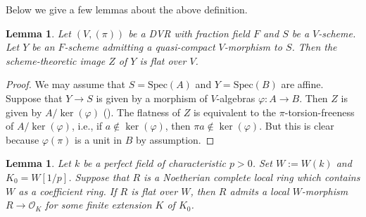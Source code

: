 \documentclass[letter, 11pt]{article}
\theoremstyle{plain}
\newtheorem{lemma}[subsubsection]{Lemma}
\theoremstyle{definition}
\newcommand{\Spec}{\mathrm{Spec}}
\newcommand{\<}{\langle}
\renewcommand{\>}{\rangle}
\newcommand{\sO}{\mathcal{O}}
\begin{document}
Below we give a few lemmas about the above definition. 

\begin{lemma}
\label{lem: Zariski closure is flat}
    Let $(V, (\pi))$ be a DVR with fraction field $F$ and $S$ be a $V$-scheme. Let $Y$ be an $F$-scheme admitting a quasi-compact $V$-morphism to $S$. Then the scheme-theoretic image $Z$ of $Y$ is flat over $V$. 
\end{lemma}

\begin{proof}
    We may assume that $S = \Spec(A)$ and $Y = \Spec(B)$ are affine. Suppose that $Y \to S$ is given by a morphism of $V$-algebras $\varphi: A \to B$. Then $Z$ is given by $A / \ker(\varphi)$ (\cite[01R8]{stacks-project}). The flatness of $Z$ is equivalent to the $\pi$-torsion-freeness of $A / \ker(\varphi)$, i.e., if $a \not\in \ker(\varphi)$, then $\pi a \not\in \ker(\varphi)$. But this is clear because $\varphi(\pi)$ is a unit in $B$ by assumption. 
\end{proof}

\begin{lemma}
\label{lem: Deligne's little lemma}
 Let $k$ be a perfect field of characteristic $p > 0$. Set $W := W(k)$ and $K_0 = W[1/p]$. Suppose that $R$ is a Noetherian complete local ring which contains $W$ as a coefficient ring. If $R$ is flat over $W$, then $R$ admits a local $W$-morphism $R \to \sO_K$ for some finite extension $K$ of $K_0$. 
\end{lemma}


\end{document}
